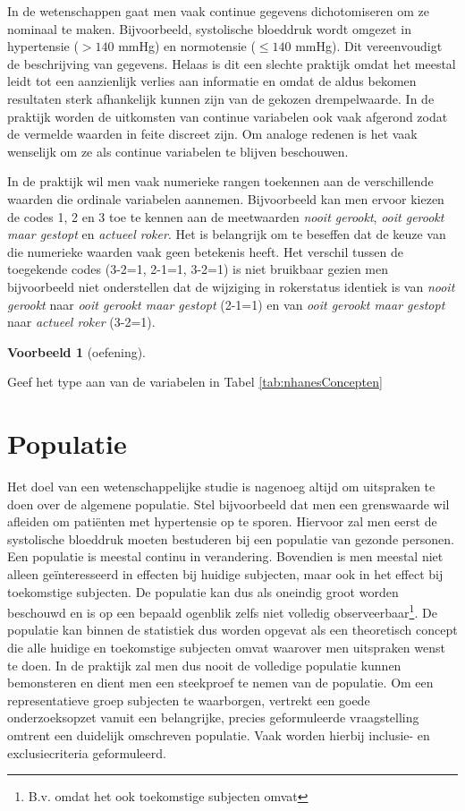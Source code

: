 \documentclass[
  12pt,dutch,coursenotes]{book}
\theoremstyle{definition}
\theoremstyle{definition}
\newtheorem{example}{Voorbeeld}[chapter]
\theoremstyle{definition}
\theoremstyle{definition}
\theoremstyle{remark}
\begin{document}
In de wetenschappen gaat men vaak continue
gegevens dichotomiseren om ze nominaal te maken. Bijvoorbeeld, systolische
bloeddruk wordt omgezet in hypertensie (\(>140\) mmHg) en normotensie (\(\leq 140\)
mmHg). Dit vereenvoudigt de beschrijving van gegevens. Helaas is dit een
slechte praktijk omdat het meestal leidt tot een aanzienlijk verlies aan informatie en
omdat de aldus bekomen resultaten sterk afhankelijk kunnen zijn van de
gekozen drempelwaarde. In de praktijk worden de uitkomsten van continue
variabelen ook vaak afgerond zodat de vermelde waarden in feite discreet
zijn. Om analoge redenen is het vaak wenselijk om ze als continue variabelen
te blijven beschouwen.

In de praktijk wil men vaak numerieke rangen toekennen aan de verschillende
waarden die ordinale variabelen aannemen. Bijvoorbeeld kan men ervoor kiezen
de codes 1, 2 en 3 toe te kennen aan de meetwaarden \emph{nooit gerookt}, \emph{ooit gerookt maar gestopt} en \emph{actueel roker}.
Het is belangrijk om te beseffen dat de keuze van die numerieke waarden vaak geen betekenis heeft.
Het verschil tussen de toegekende codes (3-2=1, 2-1=1, 3-2=1) is niet bruikbaar gezien men bijvoorbeeld niet onderstellen dat de wijziging in rokerstatus identiek is van \emph{nooit gerookt} naar \emph{ooit gerookt maar gestopt} (2-1=1) en van \emph{ooit gerookt maar gestopt} naar \emph{actueel roker} (3-2=1).

\begin{example}[oefening]
\protect\hypertarget{exm:unnamed-chunk-30}{}{\label{exm:unnamed-chunk-30} {} }
\end{example}
Geef het type aan van de variabelen in Tabel \ref{tab:nhanesConcepten}

\hypertarget{subsec:pop}{%
\section{Populatie}\label{subsec:pop}}

Het doel van een wetenschappelijke studie is nagenoeg altijd om uitspraken te doen over de algemene populatie.
Stel bijvoorbeeld dat men een grenswaarde wil afleiden om patiënten met hypertensie op te sporen.
Hiervoor zal men eerst de systolische bloeddruk moeten bestuderen bij een populatie van gezonde personen.
Een populatie is meestal continu in verandering.
Bovendien is men meestal niet alleen geïnteresseerd in effecten bij huidige subjecten, maar ook in het effect bij toekomstige subjecten.
De populatie kan dus als oneindig groot worden beschouwd en is op een bepaald ogenblik zelfs niet volledig observeerbaar\footnote{B.v. omdat het ook toekomstige subjecten omvat}.
De populatie kan binnen de statistiek dus worden opgevat als een theoretisch concept die alle huidige en toekomstige subjecten omvat waarover men uitspraken wenst te doen.
In de praktijk zal men dus nooit de volledige populatie kunnen bemonsteren en dient men een steekproef te nemen van de populatie.
Om een representatieve groep subjecten te waarborgen, vertrekt een goede onderzoeksopzet vanuit een belangrijke, precies geformuleerde vraagstelling
omtrent een duidelijk omschreven populatie.
Vaak worden hierbij inclusie- en exclusiecriteria geformuleerd.
\end{document}
